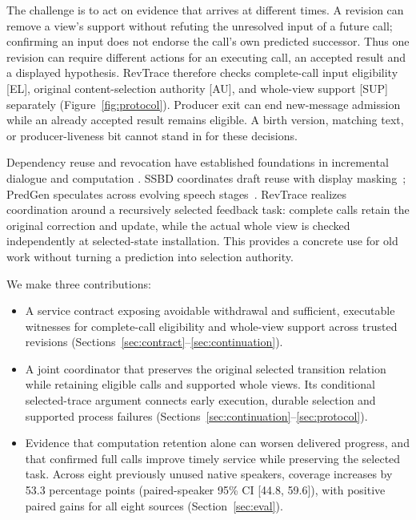 The challenge is to act on evidence that arrives at different times.
A revision can remove a view's support without refuting the unresolved
input of a future call; confirming an input does not endorse the call's
own predicted successor. Thus one revision can require different actions
for an executing call, an accepted result and a displayed hypothesis.
RevTrace therefore checks complete-call input eligibility [EL], original
content-selection authority [AU], and whole-view support [SUP] separately
(Figure~\ref{fig:protocol}). Producer exit can end new-message admission
while an already accepted result remains eligible. A birth version,
matching text, or producer-liveness bit cannot stand in for these decisions.

Dependency reuse and revocation have established foundations in
incremental dialogue and computation
\cite{schlangen2011incremental,hammer2014adapton,hammer2015names}.
SSBD coordinates draft reuse with display masking~\cite{zeng2026ssbd};
PredGen speculates across evolving speech stages~\cite{li2025predgen}.
RevTrace realizes coordination around a recursively selected feedback
task: complete calls retain the original correction and update, while
the actual whole view is checked independently at selected-state
installation. This provides a concrete use for old work without turning
a prediction into selection authority.

We make three contributions:
\begin{itemize}
\item A service contract exposing avoidable withdrawal and sufficient,
  executable witnesses for complete-call eligibility and whole-view
  support across trusted revisions
  (Sections~\ref{sec:contract}--\ref{sec:continuation}).
\item A joint coordinator that preserves the original selected transition
  relation while retaining eligible calls and supported whole views.
  Its conditional selected-trace argument connects early execution,
  durable selection and supported process failures
  (Sections~\ref{sec:continuation}--\ref{sec:protocol}).
\item Evidence that computation retention alone can worsen delivered
  progress, and that confirmed full calls improve timely service while
  preserving the selected task. Across eight previously unused native
  speakers, coverage increases by 53.3 percentage points
  (paired-speaker 95\% CI [44.8, 59.6]), with positive paired gains for all
  eight sources (Section~\ref{sec:eval}).
\end{itemize}

